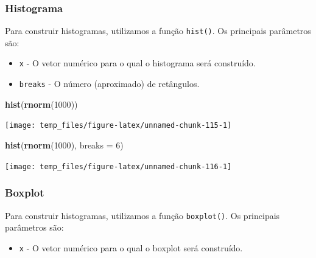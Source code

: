 \documentclass[]{book}
\newenvironment{Shaded}{\begin{snugshade}}{\end{snugshade}}
\newcommand{\DataTypeTok}[1]{\textcolor[rgb]{0.13,0.29,0.53}{#1}}
\newcommand{\DecValTok}[1]{\textcolor[rgb]{0.00,0.00,0.81}{#1}}
\newcommand{\KeywordTok}[1]{\textcolor[rgb]{0.13,0.29,0.53}{\textbf{#1}}}
\newcommand{\NormalTok}[1]{#1}
\providecommand{\tightlist}{%
  \setlength{\itemsep}{0pt}\setlength{\parskip}{0pt}}
\begin{document}
\hypertarget{histograma}{%
\subsubsection{Histograma}\label{histograma}}

Para construir histogramas, utilizamos a função \texttt{hist()}. Os principais parâmetros são:

\begin{itemize}
\tightlist
\item
  \texttt{x} - O vetor numérico para o qual o histograma será construído.
\item
  \texttt{breaks} - O número (aproximado) de retângulos.
\end{itemize}

\begin{Shaded}
\begin{Highlighting}[]
\KeywordTok{hist}\NormalTok{(}\KeywordTok{rnorm}\NormalTok{(}\DecValTok{1000}\NormalTok{))}
\end{Highlighting}
\end{Shaded}

\begin{center}\texttt{[image: temp\_files/figure-latex/unnamed-chunk-115-1]} \end{center}

\begin{Shaded}
\begin{Highlighting}[]
\KeywordTok{hist}\NormalTok{(}\KeywordTok{rnorm}\NormalTok{(}\DecValTok{1000}\NormalTok{), }\DataTypeTok{breaks =} \DecValTok{6}\NormalTok{)}
\end{Highlighting}
\end{Shaded}

\begin{center}\texttt{[image: temp\_files/figure-latex/unnamed-chunk-116-1]} \end{center}

\hypertarget{boxplot}{%
\subsubsection{Boxplot}\label{boxplot}}

Para construir histogramas, utilizamos a função \texttt{boxplot()}. Os principais parâmetros são:

\begin{itemize}
\tightlist
\item
  \texttt{x} - O vetor numérico para o qual o boxplot será construído.
\end{itemize}
\end{document}
